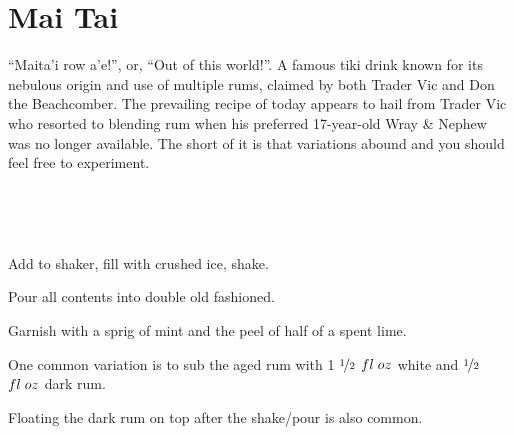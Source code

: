 \section[Mai Tai]{Mai Tai}

\begin{recipestats}[
	servings=1,
	preptime=5 \minute,
	original=\citefield{cocktailSeminars2021}{title} \cite{cocktailSeminars2021},
]
\end{recipestats}


\begin{recipeabstract}
	``Maita'i row a'e!'', or, ``Out of this world!''.
	A famous tiki drink known for its nebulous origin and use of multiple rums, claimed by both Trader Vic and Don the Beachcomber.
	The prevailing recipe of today appears to hail from Trader Vic who resorted to blending rum when his preferred 17-year-old Wray \& Nephew was no longer available.
	The short of it is that variations abound and you should feel free to experiment.

\end{recipeabstract}


\begin{ingredientcolumns}
	\begin{ingredientblock}
		\\
	\end{ingredientblock}
	\begin{ingredientblock}
		\ingredient[\onehalf][\fluidounce]{cura\c{c}ao}\\
		\ingredient[\onehalf][\fluidounce]{orgeat}
	\end{ingredientblock}
\end{ingredientcolumns}


\begin{preparation}
\item Add to shaker, fill with crushed ice, shake.
\item Pour all contents into double old fashioned.
\item Garnish with a sprig of mint and the peel of half of a spent lime.
\end{preparation}


\begin{variation}
\item One common variation is to sub the aged rum with 1 $\nicefrac{1}{2}$ $fl\;oz$ white and $\nicefrac{1}{2}$ $fl\;oz$ dark rum.
\item Floating the dark rum on top after the shake/pour is also common.
\end{variation}


\recipeend

